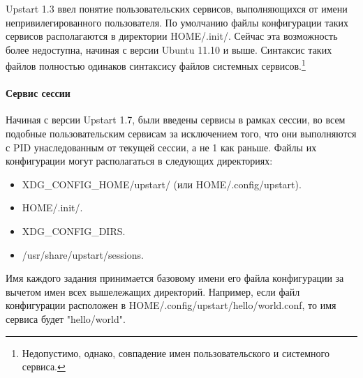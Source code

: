 Upstart 1.3 ввел понятие пользовательских сервисов, выполняющихся от имени непривилегированного пользователя. По умолчанию файлы конфигурации таких сервисов располагаются в директории \textdollar HOME/.init/. Сейчас эта возможность более недоступна, начиная с версии Ubuntu 11.10 и выше.
Синтаксис таких файлов полностью одинаков синтаксису файлов системных сервисов.\footnote{Недопустимо, однако, совпадение имен пользовательского и системного сервиса.}
\paragraph{Сервис сессии}
Начиная с версии Upstart 1.7, были введены сервисы в рамках сессии, во всем подобные пользовательским сервисам за исключением того, что они выполняются с PID унаследованным от текущей сессии, а не 1 как
раньше. 
Файлы их конфигурации могут располагаться в следующих директориях: \begin{itemize}
\item \textdollar XDG\_CONFIG\_HOME/upstart/ (или \textdollar HOME/.config/upstart).
\item \textdollar HOME/.init/.
\item \textdollar XDG\_CONFIG\_DIRS.
\item /usr/share/upstart/sessions.
\end{itemize}
Имя каждого задания принимается базовому имени его файла конфигурации за вычетом имен всех вышележащих директорий. Например, если файл конфигурации расположен в \textdollar HOME/.config/upstart/hello/world.conf, то имя сервиса будет "hello/world".